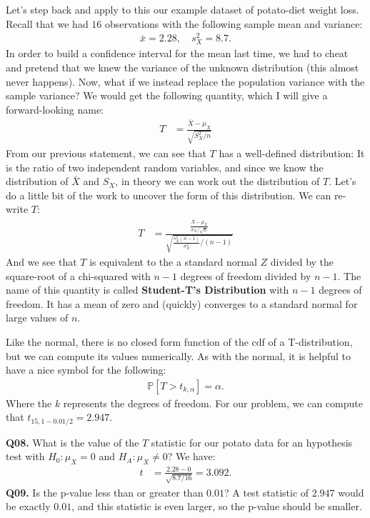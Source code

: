 \documentclass[12pt]{article}
\newcommand{\Prob}{\mathbb{P}}
\newcommand{\cblack}{\color{Black}}
\newcommand{\cblue}{\color{MidnightBlue}}
\begin{document}
Let's step back and apply to this our example dataset of potato-diet weight
loss. Recall that we had $16$ observations with the following sample mean and
variance:
\begin{align*}
\bar{x} = 2.28, \quad s^2_X = 8.7. 
\end{align*}
In order to build a confidence interval for the mean last time, we had to cheat
and pretend that we knew the variance of the unknown distribution (this almost
never happens). Now, what if we instead replace the population variance with 
the sample variance? We would get the following quantity, which I will give a
forward-looking name:
\begin{align*}
T &= \frac{\bar{X} - \mu_X}{\sqrt{S_X^2 / n}}
\end{align*}
From our previous statement, we can see that $T$ has a well-defined distribution:
It is the ratio of two independent random variables, and since we know the
distribution of $\bar{X}$ and $S_X$, in theory we can work out the distribution
of $T$. Let's do a little bit of the work to uncover the form of this distribution.
We can re-write $T$:
\begin{align*}
T &= \frac{\frac{\bar{X} - \mu_X}{\sigma_X / \sqrt{n}}}{\sqrt{\frac{s_X^2(n-1)}{\sigma_X^2} / (n-1) }}
\end{align*}
And we see that $T$ is equivalent to the a standard normal $Z$ divided by the
square-root of a chi-squared with $n-1$ degrees of freedom divided by $n-1$.
The name of this quantity is called \textbf{Student-T's Distribution} with $n-1$
degrees of freedom. It has a mean of zero and (quickly) converges to a standard
normal for large values of $n$.


Like the normal, there is no closed form function of the cdf of a T-distribution,
but we can compute its values numerically. As with the normal, it is helpful to
have a nice symbol for the following:
\begin{align*}
\Prob \left[ T > t_{k, \alpha} \right] = \alpha.
\end{align*}
Where the $k$ represents the degrees of freedom. For our problem, we can compute
that $t_{15, 1 - 0.01/2} = 2.947$.

\textbf{Q08.} What is the value of the $T$ statistic for our potato data for an
hypothesis test with $H_0: \mu_X = 0$ and $H_A: \mu_X \neq 0$? \cblue
We have:
\begin{align*}
t &= \frac{2.28 - 0}{\sqrt{8.7 / 16}} = 3.092.
\end{align*}
\cblack \textbf{Q09.} Is the p-value less than or greater than $0.01$? \cblue
A test statistic of $2.947$ would be exactly $0.01$, and this statistic is even
larger, so the p-value should be smaller. \cblack
\end{document}
